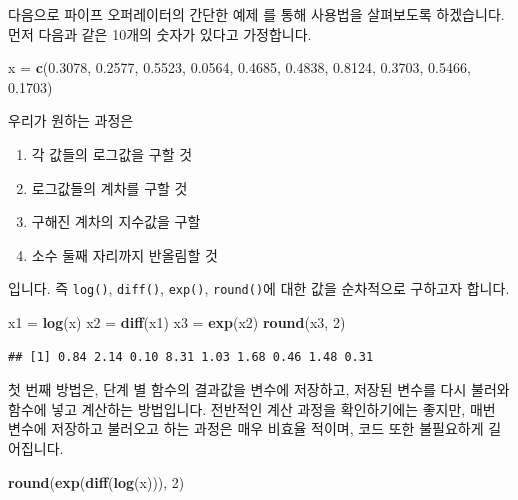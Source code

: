 \documentclass[]{book}
\newenvironment{Shaded}{\begin{snugshade}}{\end{snugshade}}
\newcommand{\DecValTok}[1]{\textcolor[rgb]{0.00,0.00,0.81}{#1}}
\newcommand{\FloatTok}[1]{\textcolor[rgb]{0.00,0.00,0.81}{#1}}
\newcommand{\KeywordTok}[1]{\textcolor[rgb]{0.13,0.29,0.53}{\textbf{#1}}}
\newcommand{\NormalTok}[1]{#1}
\newcommand{\StringTok}[1]{\textcolor[rgb]{0.31,0.60,0.02}{#1}}
\providecommand{\tightlist}{%
  \setlength{\itemsep}{0pt}\setlength{\parskip}{0pt}}
\begin{document}
다음으로 파이프 오퍼레이터의 간단한 예제 를 통해 사용법을 살펴보도록 하겠습니다. 먼저 다음과 같은 10개의 숫자가 있다고 가정합니다.

\begin{Shaded}
\begin{Highlighting}[]
\NormalTok{x =}\StringTok{ }\KeywordTok{c}\NormalTok{(}\FloatTok{0.3078}\NormalTok{, }\FloatTok{0.2577}\NormalTok{, }\FloatTok{0.5523}\NormalTok{, }\FloatTok{0.0564}\NormalTok{, }\FloatTok{0.4685}\NormalTok{,}
      \FloatTok{0.4838}\NormalTok{, }\FloatTok{0.8124}\NormalTok{, }\FloatTok{0.3703}\NormalTok{, }\FloatTok{0.5466}\NormalTok{, }\FloatTok{0.1703}\NormalTok{)}
\end{Highlighting}
\end{Shaded}

우리가 원하는 과정은

\begin{enumerate}
\def\labelenumi{\arabic{enumi}.}
\tightlist
\item
  각 값들의 로그값을 구할 것
\item
  로그값들의 계차를 구할 것
\item
  구해진 계차의 지수값을 구할
\item
  소수 둘째 자리까지 반올림할 것
\end{enumerate}

입니다. 즉 \texttt{log()}, \texttt{diff()}, \texttt{exp()}, \texttt{round()}에 대한 값을 순차적으로 구하고자 합니다.

\begin{Shaded}
\begin{Highlighting}[]
\NormalTok{x1 =}\StringTok{ }\KeywordTok{log}\NormalTok{(x)}
\NormalTok{x2 =}\StringTok{ }\KeywordTok{diff}\NormalTok{(x1)}
\NormalTok{x3 =}\StringTok{ }\KeywordTok{exp}\NormalTok{(x2)}
\KeywordTok{round}\NormalTok{(x3, }\DecValTok{2}\NormalTok{)}
\end{Highlighting}
\end{Shaded}

\begin{verbatim}
## [1] 0.84 2.14 0.10 8.31 1.03 1.68 0.46 1.48 0.31
\end{verbatim}

첫 번째 방법은, 단계 별 함수의 결과값을 변수에 저장하고, 저장된 변수를 다시 불러와 함수에 넣고 계산하는 방법입니다. 전반적인 계산 과정을 확인하기에는 좋지만, 매번 변수에 저장하고 불러오고 하는 과정은 매우 비효율 적이며, 코드 또한 불필요하게 길어집니다.

\begin{Shaded}
\begin{Highlighting}[]
\KeywordTok{round}\NormalTok{(}\KeywordTok{exp}\NormalTok{(}\KeywordTok{diff}\NormalTok{(}\KeywordTok{log}\NormalTok{(x))), }\DecValTok{2}\NormalTok{)}
\end{Highlighting}
\end{Shaded}
\end{document}
